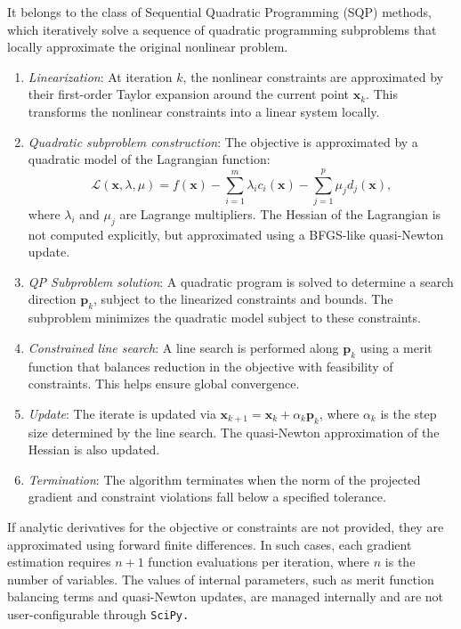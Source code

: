 It belongs to the class of Sequential Quadratic Programming (SQP) methods, which iteratively solve a sequence of quadratic programming subproblems that locally approximate the original nonlinear problem. 
\begin{enumerate}
    \item \textit{Linearization}: At iteration $k$, the nonlinear constraints are approximated by their first-order Taylor expansion around the current point $\mathbf{x}_k$.
    This transforms the nonlinear constraints into a linear system locally.
    \item \textit{Quadratic subproblem construction}: The objective is approximated by a quadratic model of the Lagrangian function: \begin{equation}
        \mathcal{L}(\mathbf{x}, \lambda, \mu) = f(\mathbf{x}) - \sum_{i=1}^{m} \lambda_i c_i(\mathbf{x}) - \sum_{j=1}^{p} \mu_j d_j(\mathbf{x}),
    \end{equation}
    where $\lambda_i$ and $\mu_j$ are Lagrange multipliers. 
    The Hessian of the Lagrangian is not computed explicitly, but approximated using a BFGS-like quasi-Newton update.
    \item \textit{QP Subproblem solution}: A quadratic program is solved to determine a search direction $\mathbf{p}_k$, subject to the linearized constraints and bounds. 
    The subproblem minimizes the quadratic model subject to these constraints.
    \item \textit{Constrained line search}: A line search is performed along $\mathbf{p}_k$ using a merit function that balances reduction in the objective with feasibility of constraints. 
    This helps ensure global convergence.
    \item \textit{Update}: The iterate is updated via $\mathbf{x}_{k+1} = \mathbf{x}_k + \alpha_k \mathbf{p}_k$, where $\alpha_k$ is the step size determined by the line search. 
    The quasi-Newton approximation of the Hessian is also updated.
    \item \textit{Termination}: The algorithm terminates when the norm of the projected gradient and constraint violations fall below a specified tolerance.
\end{enumerate}

If analytic derivatives for the objective or constraints are not provided, they are approximated using forward finite differences. 
In such cases, each gradient estimation requires $n+1$ function evaluations per iteration, where $n$ is the number of variables.
The values of internal parameters, such as merit function balancing terms and quasi-Newton updates, are managed internally and are not user-configurable through \tt{SciPy}.

